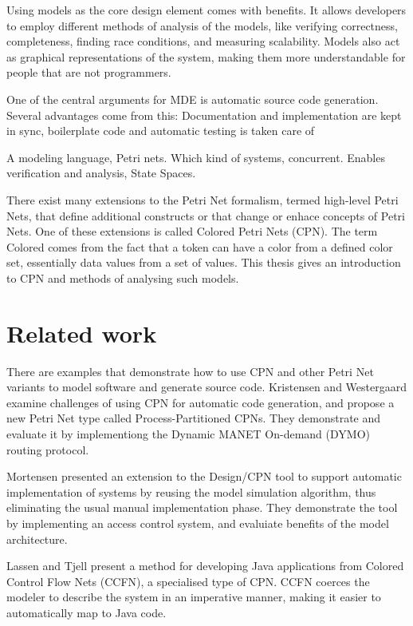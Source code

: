 Using models as the core design element comes with benefits. It allows
developers to employ different methods of analysis of the models, like verifying
correctness, completeness, finding race conditions, and measuring scalability. Models also
act as graphical representations of the system, making them more understandable
for people that are not programmers. 

One of the central arguments for MDE is automatic source code generation.
Several advantages come from this: Documentation and implementation are kept in
sync, boilerplate code and automatic testing is taken care of 

A modeling language, Petri nets. Which kind of systems, concurrent. 
Enables verification and analysis, State Spaces. 

There exist many extensions to the Petri Net formalism, termed high-level Petri
Nets, that define additional constructs or that change or enhace concepts of
Petri Nets. One of these extensions is called Colored Petri Nets (CPN). The term
Colored comes from the fact that a token can have a color from a defined color
set, essentially data values from a set of values. This thesis gives an
introduction to CPN and methods of analysing such models.


\section{Related work}
There are examples that demonstrate how to use CPN and other Petri Net variants
to model software and generate source code. Kristensen and Westergaard
\cite{kristensen2010automatic} examine challenges of using CPN for automatic
code generation, and propose a new Petri Net type called Process-Partitioned
CPNs. They demonstrate and evaluate it by implementiong the Dynamic MANET
On-demand (DYMO) routing protocol.

Mortensen \cite{mortensen2000automatic} presented an extension to the Design/CPN
tool to support automatic implementation of systems by reusing the model
simulation algorithm, thus eliminating the usual manual implementation phase.
They demonstrate the tool by implementing an access control system, and
evaluiate benefits of the model architecture.

Lassen and Tjell \cite{lassen2010automatic}  present a method for developing
Java applications from Colored Control Flow Nets (CCFN), a specialised type of
CPN. CCFN coerces the modeler to describe the system in an
imperative manner, making it easier to automatically map to Java code.

